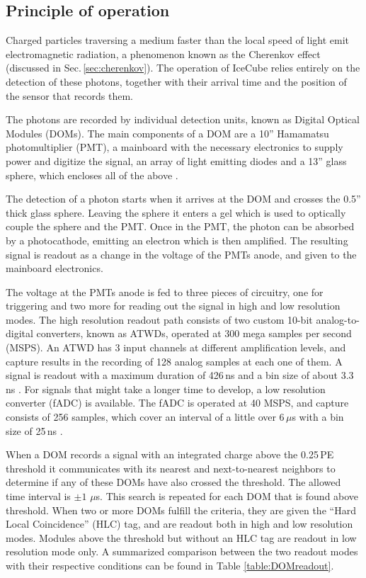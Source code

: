 \documentclass[../Main.tex]{subfiles}
\begin{document}
\subsection{Principle of operation}
\label{sec:icoperation}
Charged particles traversing a medium faster than the local speed of light emit electromagnetic radiation, a phenomenon known as the Cherenkov effect (discussed in Sec.\,\ref{sec:cherenkov}). The operation of IceCube relies entirely on the detection of these photons, together with their arrival time and the position of the sensor that records them.

The photons are recorded by individual detection units, known as Digital Optical Modules (DOMs). The main components of a DOM are a 10'' Hamamatsu photomultiplier (PMT), a mainboard with the necessary electronics to supply power and digitize the signal, an array of light emitting diodes and a 13'' glass sphere, which encloses all of the above \cite{DOMdesign}.

The detection of a photon starts when it arrives at the DOM and crosses the 0.5'' thick glass sphere. Leaving the sphere it enters a gel which is used to optically couple the sphere and the PMT. Once in the PMT, the photon can be absorbed by a photocathode, emitting an electron which is then amplified. The resulting signal is readout as a change in the voltage of the PMTs anode, and given to the mainboard electronics.

The voltage at the PMTs anode is fed to three pieces of circuitry, one for triggering and two more for reading out the signal in high and low resolution modes. The high resolution readout path consists of two custom 10-bit analog-to-digital converters, known as ATWDs, operated at 300 mega samples per second (MSPS). An ATWD has 3 input channels at different amplification levels, and capture results in the recording of 128 analog samples at each one of them. A signal is readout with a maximum duration of 426\,ns and a bin size of about 3.3\,ns \cite{icecube_pmt}. For signals that might take a longer time to develop, a low resolution converter (fADC) is available. The fADC is operated at 40 MSPS, and capture consists of 256 samples, which cover an interval of a little over 6\,$\mu$s with a bin size of 25\,ns \cite{DAQ}.

When a DOM records a signal with an integrated charge above the 0.25\,PE threshold it communicates with its nearest and next-to-nearest neighbors to determine if any of these DOMs have also crossed the threshold. The allowed time interval is $\pm1$ $\mu$s. This search is repeated for each DOM that is found above threshold. When two or more DOMs fulfill the criteria, they are given the ``Hard Local Coincidence'' (HLC) tag, and are readout both in high and low resolution modes. Modules above the threshold but without an HLC tag are readout in low resolution mode only. A summarized comparison between the two readout modes with their respective conditions can be found in Table \ref{table:DOMreadout}.
\end{document}
